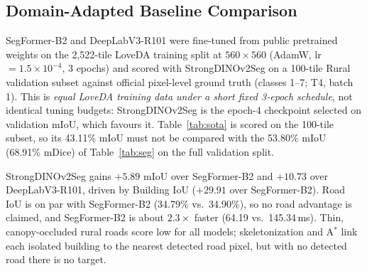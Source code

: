 \documentclass[runningheads]{llncs}
\begin{document}
\subsection{Domain-Adapted Baseline Comparison}\label{sec:sota}
SegFormer-B2 and DeepLabV3-R101 were fine-tuned from public pretrained weights on the 2,522-tile LoveDA training split at $560\times560$ (AdamW, lr $=1.5\times10^{-4}$, 3 epochs) and scored with StrongDINOv2Seg on a 100-tile Rural validation subset against official pixel-level ground truth (classes 1--7; T4, batch 1). This is \emph{equal LoveDA training data under a short fixed 3-epoch schedule}, not identical tuning budgets: StrongDINOv2Seg is the epoch-4 checkpoint selected on validation mIoU, which favours it. Table~\ref{tab:sota} is scored on the 100-tile subset, so its 43.11\% mIoU must not be compared with the 53.80\% mIoU (68.91\% mDice) of Table~\ref{tab:seg} on the full validation split.

\begin{table}[!htbp]
\caption{Fine-tuned baselines on the 100-tile Rural validation subset (not the full validation split of Table~\ref{tab:seg}); T4, $560\times560$, latency mean $\pm$ std.}\label{tab:sota}
\centering
{}
\end{table}

StrongDINOv2Seg gains $+5.89$ mIoU over SegFormer-B2 and $+10.73$ over DeepLabV3-R101, driven by Building IoU ($+29.91$ over SegFormer-B2). Road IoU is on par with SegFormer-B2 (34.79\% vs.\ 34.90\%), so no road advantage is claimed, and SegFormer-B2 is about $2.3\times$ faster (64.19 vs.\ 145.34\,ms). Thin, canopy-occluded rural roads score low for all models; skeletonization and A$^{*}$ link each isolated building to the nearest detected road pixel, but with no detected road there is no target.
\end{document}

